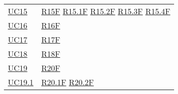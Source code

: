 \begin{center}
\begin{longtable}[!h]{m{50px} m{50px}}
        \hyperref[sec:UC15]{UC15}         & \hyperref[tab:RequisitiFunzionali]{R15F}
        \newline \hyperref[tab:RequisitiFunzionali]{R15.1F}
        \newline \hyperref[tab:RequisitiFunzionali]{R15.2F}
        \newline \hyperref[tab:RequisitiFunzionali]{R15.3F}
        \newline \hyperref[tab:RequisitiFunzionali]{R15.4F}                            \\

        \hyperref[sec:UC16]{UC16}         & \hyperref[tab:RequisitiFunzionali]{R16F}   \\
        \hyperref[sec:UC17]{UC17}         & \hyperref[tab:RequisitiFunzionali]{R17F}   \\
        \hyperref[sec:UC18]{UC18}         & \hyperref[tab:RequisitiFunzionali]{R18F}   \\
        \hyperref[sec:UC19]{UC19}         & \hyperref[tab:RequisitiFunzionali]{R20F}   \\

        \hyperref[sec:UC19.1]{UC19.1}     & \hyperref[tab:RequisitiFunzionali]{R20.1F}
        \newline \hyperref[tab:RequisitiFunzionali]{R20.2F}                            \\


\end{longtable}
\end{center}
